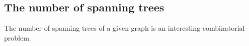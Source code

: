 

\setcounter{section}{2}
\setcounter{subsection}{5}
\setcounter{dfn}{12}

\subsection{The number of spanning trees}
The number of spanning trees of a given graph is an interesting combinatorial problem.


